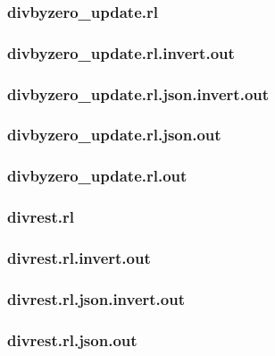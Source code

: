 \subsubsection{divbyzero\_update.rl}
\label{app:divbyzero_update_rl}

\subsubsection{divbyzero\_update.rl.invert.out}
\label{app:divbyzero_update_rl.invert.out}

\subsubsection{divbyzero\_update.rl.json.invert.out}
\label{app:divbyzero_update_rl.json.invert.out}

\subsubsection{divbyzero\_update.rl.json.out}
\label{app:divbyzero_update_rl.json.out}

\subsubsection{divbyzero\_update.rl.out}
\label{app:divbyzero_update_rl.out}

\subsubsection{divrest.rl}
\label{app:divrest_rl}

\subsubsection{divrest.rl.invert.out}
\label{app:divrest_rl.invert.out}

\subsubsection{divrest.rl.json.invert.out}
\label{app:divrest_rl.json.invert.out}

\subsubsection{divrest.rl.json.out}
\label{app:divrest_rl.json.out}

